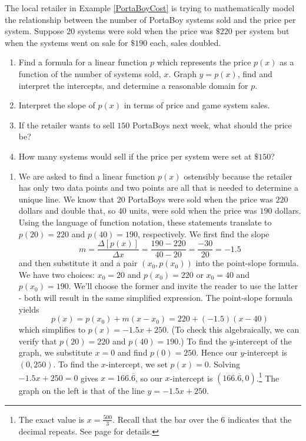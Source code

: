 \documentclass{ximera}
\begin{document}
 
 \begin{example} \label{PortaBoyDemand}  The local retailer in Example \ref{PortaBoyCost} is trying to mathematically model the relationship between the number of PortaBoy systems sold  and the price per system.  Suppose $20$ systems were sold when the price was  $\$220$ per system but when the systems went on sale for  $\$190$ each, sales doubled.
\begin{enumerate}

\item Find a formula for a linear function $p$ which represents the price $p(x)$ as a function of the number of systems sold, $x$. Graph $y = p(x)$, find and interpret the intercepts, and determine a reasonable domain for $p$.

\item Interpret the slope of $p(x)$ in terms of price and game system sales.

\item  If the retailer wants to sell $150$ PortaBoys next week, what should the price be?

\item How many systems would sell if the price per system were set at $\$150$?

\end{enumerate}

\begin{explanation}

\begin{enumerate}

\item  We are asked to find a linear function $p(x)$ ostensibly because the retailer has only two data points and two points are all that is needed to determine a unique line.  We know that $20$ PortaBoys were sold  when the price was $220$ dollars and double that, so $40$ units, were sold when the price was $190$ dollars. Using the language of function notation, these statements translate to  $p(20)=220$ and $p(40)=190$, respectively.  We first find the slope \[ m = \dfrac{\Delta [p(x)]}{\Delta x} = \dfrac{190 - 220}{40 - 20} = \dfrac{-30}{20} = -1.5\] and then substitute it and a pair $(x_0, p(x_0))$ into the point-slope formula.  We have two choices:  $x_0 = 20$ and $p(x_0) = 220$ or $x_0 = 40$ and $p(x_0) = 190$.  We'll choose the former and invite the reader to use the latter - both will result in the same simplified expression.  The point-slope formula yields  \[p(x) = p(x_0) + m (x - x_0) = 220 + (-1.5)(x - 40)\] which simplifies to $p(x) = -1.5x + 250$.  (To check this algebraically, we can verify that $p(20) = 220$ and $p(40) = 190$.) To find the $y$-intercept of the graph, we substitute $x = 0$ and find $p(0) = 250$.  Hence our $y$-intercept is $(0, 250)$.  To find the $x$-intercept, we set $p(x) = 0$. Solving $-1.5x + 250 = 0$ gives $x = 166.\overline{6}$, so our $x$-intercept is $(166.\overline{6}, 0)$.\footnote{The exact value is $x = \frac{500}{3}$. Recall that the bar over the $6$ indicates that the decimal repeats.  See page \pageref{repeatingdecimalnote} for details.} The graph on the left is that of the line $y = -1.5x + 250$.  




\end{enumerate}
\end{explanation}
\end{example}
\end{document}

